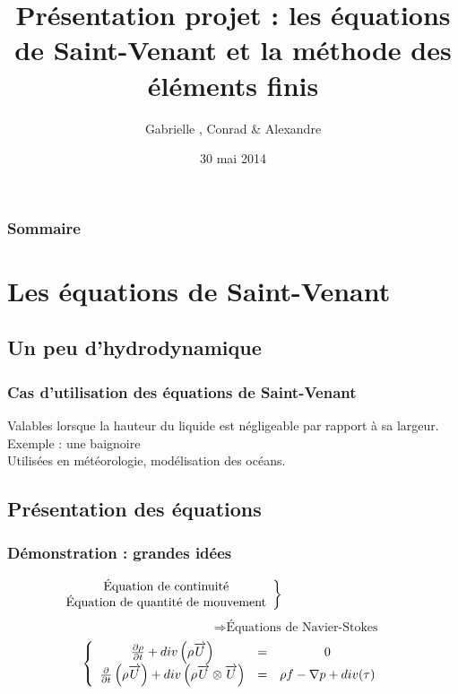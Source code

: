 \documentclass[handout]{beamer}
\title[Saint-Venant]{Présentation projet : les équations de Saint-Venant et la méthode des éléments finis}
\author{Gabrielle \bsc{Collette}, Conrad \bsc{Hillairet} \& Alexandre \bsc{Vieira}}
\institute{INSA de Rouen}
\date{30 mai 2014}
\begin{document}
\begin{frame}
\titlepage
\end{frame}

\begin{frame}
	\frametitle{Sommaire}
	\tableofcontents
\end{frame}

\section{Les équations de Saint-Venant}
\subsection[Hydrodynam.]{Un peu d'hydrodynamique} %
 
\begin{frame}
	\frametitle{Cas d'utilisation des équations de Saint-Venant}
		Valables lorsque la hauteur du liquide est négligeable par rapport à sa largeur. Exemple : une baignoire\\
		Utilisées en météorologie, modélisation des océans. 
\end{frame}

\subsection[Équations]{Présentation des équations}

\begin{frame}
	\frametitle{Démonstration : grandes idées}
	\[\hspace{-10em}\left.\begin{array}{c} \text{Équation de continuité} \\ \text{Équation de quantité de mouvement} \end{array}\right\}\] 
	\[\hspace{10em}\Rightarrow \text{Équations de Navier-Stokes} \]
	\[\left\{ \begin{array}{c c c}
	\frac{\partial \rho}{\partial t} + div\left(\rho \overrightarrow{U}\right)&=&0\\
	\frac{\partial}{\partial t} \left( \rho \overrightarrow{U} \right) + div\left( \rho \overrightarrow{U} \otimes \overrightarrow{U}\right) &=& \rho f -\nabla p + div(\tau)
\end{array}\right.\]
\end{frame}
\end{document}

